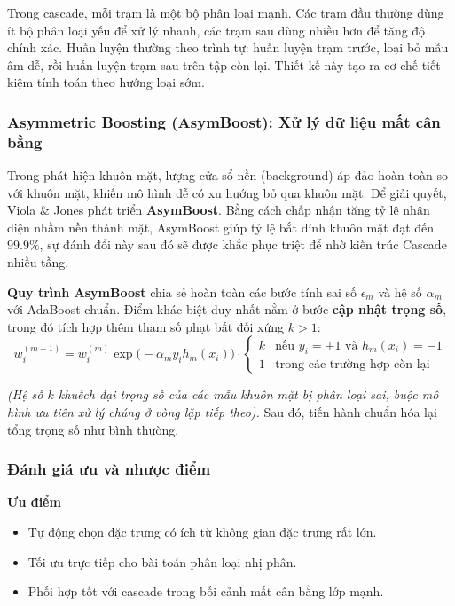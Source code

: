Trong cascade, mỗi trạm là một bộ phân loại mạnh.
Các trạm đầu thường dùng ít bộ phân loại yếu để xử lý nhanh, các trạm sau dùng nhiều hơn để tăng độ chính xác.
Huấn luyện thường theo trình tự:
huấn luyện trạm trước, loại bỏ mẫu âm dễ, rồi huấn luyện trạm sau trên tập còn lại.
Thiết kế này tạo ra cơ chế tiết kiệm tính toán theo hướng loại sớm.  \cite{viola2001rapid,viola2004robust,li2012facechapter}

\subsubsection{Asymmetric Boosting (AsymBoost): Xử lý dữ liệu mất cân bằng}

Trong phát hiện khuôn mặt, lượng cửa sổ nền (background) áp đảo hoàn toàn so với khuôn mặt, khiến mô hình dễ có xu hướng bỏ qua khuôn mặt. Để giải quyết, Viola \& Jones phát triển \textbf{AsymBoost}. Bằng cách chấp nhận tăng tỷ lệ nhận diện nhầm nền thành mặt, AsymBoost giúp tỷ lệ bắt dính khuôn mặt đạt đến $99.9\%$, sự đánh đổi này sau đó sẽ được khắc phục triệt để nhờ kiến trúc Cascade nhiều tầng.

\noindent\textbf{Quy trình AsymBoost} chia sẻ hoàn toàn các bước tính sai số $\epsilon_m$ và hệ số $\alpha_m$ với AdaBoost chuẩn. Điểm khác biệt duy nhất nằm ở bước \textbf{cập nhật trọng số}, trong đó tích hợp thêm tham số phạt bất đối xứng $k > 1$:
\[
w_i^{(m+1)} = w_i^{(m)}\exp\!\big(-\alpha_m y_i h_m(x_i)\big) \cdot \begin{cases} k & \text{nếu } y_i = +1 \text{ và } h_m(x_i) = -1 \\ 1 & \text{trong các trường hợp còn lại} \end{cases}
\]

\textit{(Hệ số $k$ khuếch đại trọng số của các mẫu khuôn mặt bị phân loại sai, buộc mô hình ưu tiên xử lý chúng ở vòng lặp tiếp theo).} Sau đó, tiến hành chuẩn hóa lại tổng trọng số như bình thường.


\subsubsection{Đánh giá ưu và nhược điểm}

\noindent\textbf{Ưu điểm}
\begin{itemize}
  \item Tự động chọn đặc trưng có ích từ không gian đặc trưng rất lớn.
  \item Tối ưu trực tiếp cho bài toán phân loại nhị phân.
  \item Phối hợp tốt với cascade trong bối cảnh mất cân bằng lớp mạnh.
\end{itemize}

